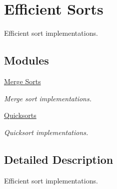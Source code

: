 \hypertarget{group__EfficientSort}{}\section{Efficient Sorts}
\label{group__EfficientSort}


Efficient sort implementations.  


\subsection*{Modules}
\begin{DoxyCompactItemize}
\item 
\hyperlink{group__MergeSort}{Merge Sorts}
\begin{DoxyCompactList}\small\item\em Merge sort implementations. \end{DoxyCompactList}\item 
\hyperlink{group__QuickSort}{Quicksorts}
\begin{DoxyCompactList}\small\item\em Quicksort implementations. \end{DoxyCompactList}\end{DoxyCompactItemize}


\subsection{Detailed Description}
Efficient sort implementations. 

